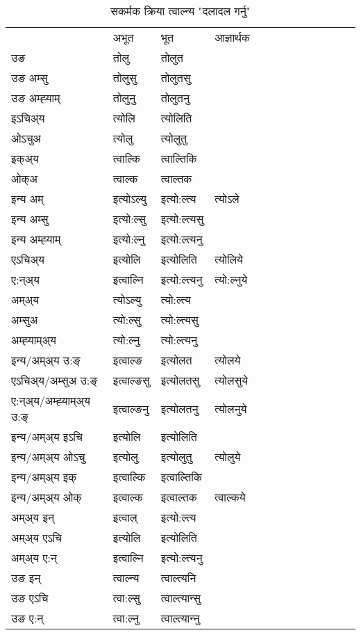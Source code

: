 \begin{table}[H]
\centering
\caption{\label{ol.vt} सकर्मक क्रिया  त्वाल्न्य  "दलादल गर्नु"  }
\begin{tabular}{l|l|l|l|l|l|l|l|l|l|l|l|l}  \toprule
&अभूत & भूत & आज्ञार्थक \\ 
उङ &तोलु &तोलुत \\ 
उङ अम्सु &तोलुसु &तोलुतसु \\ 
उङ अम्ह्‍याम् &तोलुनु &तोलुतनु \\ 
इऽचिअ्य &त्योलि &त्योलिति   \\ 
ओऽचुअ &त्योलु &त्योलुतु   \\ 
इक्अ्य &त्वाल्कि &त्वाल्तिकि   \\ 
ओक्अ &त्वाल्क &त्वाल्तक   \\ 
इन्य अम् & इत्योऽल्यु  & इत्यो:ल्त्य &त्योऽले  \\ 
इन्य अम्सु & इत्यो:ल्सु  & इत्यो:ल्त्यसु   \\ 
इन्य अम्ह्‍याम् & इत्यो:ल्नु  & इत्यो:ल्त्यनु   \\ 
एऽचिअ्य & इत्योलि & इत्योलिति &त्योलिये    \\ 
ए:न्अ्य & इत्वाल्नि  & इत्यो:ल्त्यनु &त्यो:ल्नुये  \\ 
अम्अ्य & त्योऽल्यु  & त्यो:ल्त्य  \\ 
अम्सुअ & त्यो:ल्सु & त्यो:ल्त्यसु  \\ 
अम्ह्‍याम्अ्य & त्यो:ल्नु  & त्यो:ल्त्यनु \\ 
\midrule
इन्य/अम्अ्य उ:ङ्‌&इत्वाल्ङ & इत्योलत &त्योलये \\ 
एऽचिअ्य/अम्सुअ उ:ङ्‌ &इत्वाल्ङसु & इत्योलतसु &त्योलसुये \\ 
ए:न्अ्य/अम्ह्‍याम्अ्य उ:ङ्‌ &इत्वाल्ङनु & इत्योलतनु &त्योलनुये \\ 
इन्य/अम्अ्य इऽचि & इत्योलि & इत्योलिति    \\ 
इन्य/अम्अ्य ओऽचु & इत्योलु & इत्योलुतु  &त्योलुये  \\ 
इन्य/अम्अ्य इक् & इत्वाल्कि & इत्वाल्तिकि   \\ 
इन्य/अम्अ्य ओक् & इत्वाल्क & इत्वाल्तक  &त्वाल्कये  \\ 
अम्अ्य इन् & इत्वाल् & इत्यो:ल्त्य   \\ 
अम्अ्य एऽचि & इत्योलि & इत्योलिति    \\ 
अम्अ्य ए:न् & इत्वाल्नि  & इत्यो:ल्त्यनु  \\ 
\midrule
उङ इन् & त्वाल्न्य  & त्वाल्त्यनि  \\ 
उङ एऽचि & त्वा:ल्सु  & त्वाल्त्यान्सु   \\ 
उङ ए:न्& त्वा:ल्नु  & त्वाल्त्यान्‍नु   \\ 
\bottomrule
\end{tabular}
\end{table}


